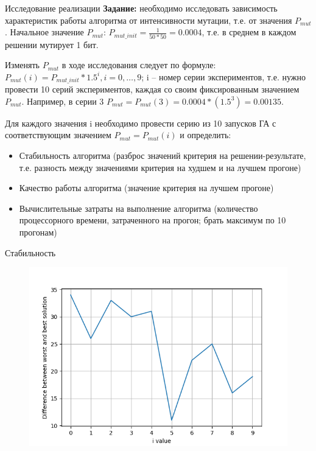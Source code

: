 \documentclass[a4paper,12pt,titlepage,final]{article}
\begin{document}
\begin{section}{Исследование реализации}
    \textbf{Задание:} необходимо исследовать зависимость характеристик работы алгоритма от интенсивности мутации, т.е. от значения $P_{mut}$. 
    Начальное значение $P_{mut}$: $P_{mut\_init} = \frac{1}{50 * 50} = 0.0004$, т.е. в среднем в каждом решении мутирует 1 бит.

    Изменять $P_{mut}$ в ходе исследования следует по формуле: $P_{mut}(i) = P_{mut\_init} * 1.5^i, i = 0,\ldots,9$; i – номер серии экспериментов, т.е. нужно провести 10 серий экспериментов, каждая со своим фиксированным значением $P_{mut}$. Например, в серии 3 $P_{mut}=P_{mut}(3)=0.0004*(1.5^3)=0.00135$.
    
    Для каждого значения i необходимо провести серию из 10 запусков ГА с соответствующим значением $P_{mut} = P_{mut}(i)$ и определить:
    \begin{itemize}
        \item Стабильность алгоритма (разброс значений критерия на решении-результате, т.е. разность между значениями критерия на худшем и на лучшем прогоне)
        \item Качество работы алгоритма (значение критерия на лучшем прогоне)
        \item Вычислительные затраты на выполнение алгоритма (количество процессорного времени, затраченного на прогон; брать максимум по 10 прогонам)
    \end{itemize}

\newpage
    
    \begin{subsection}{Стабильность}
    
    \begin{figure}[H]
    	\includegraphics[width=17cm]{1.png}
    	\label{pic:2}
    \end{figure}


\end{subsection}
\end{section}
\end{document}
